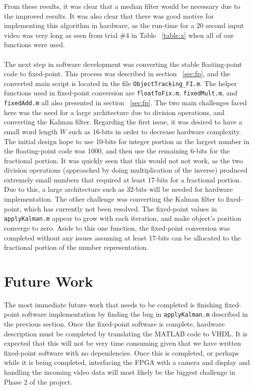 \documentclass[12pt]{article} %
\begin{document}
\FloatBarrier
\noindent
From these results, it was clear that a median filter would be necessary due to the improved results. It was also clear that there was good motive for implementing this algorithm in hardware, as the run-time for a 20 second input video was very long as seen from trial \#4 in Table ~\ref{table:x} when all of our functions were used. \\\\
The next step in software development was converting the stable floating-point code to fixed-point. This process was described in section ~\ref{sec:fp}, and the converted main script is located in the file \texttt{ObjectTracking\_FI.m}. The helper functions used in fixed-point conversion are \texttt{floatToFix.m}, \texttt{fixedMult.m}, and \texttt{fixedAdd.m} all also presented in section ~\ref{sec:fp}. The two main challenges faced here was the need for a large architecture due to division operations, and converting the Kalman filter. Regarding the first issue, it was desired to have a small word length $W$ such as 16-bits in order to decrease hardware complexity. The initial design hope to use 10-bits for integer portion as the largest number in the floating-point code was 1000, and then use the remaining 6-bits for the fractional portion. It was quickly seen that this would not not work, as the two division operations (approached by doing multiplication of the inverse) produced extremely small numbers that required at least 17-bits for a fractional portion. Due to this, a large architecture such as 32-bits will be needed for hardware implementation. The other challenge was converting the Kalman filter to fixed-point, which has currently not been resolved. The fixed-point values in \texttt{applyKalman.m} appear to grow with each iteration, and make object's position converge to zero. Aside to this one function, the fixed-point conversion was completed without any issues assuming at least 17-bits can be allocated to the fractional portion of the number representation.
\section{Future Work}
The most immediate future work that needs to be completed is finishing fixed-point software implementation by finding the bug in \texttt{applyKalman.m} described in the previous section. Once the fixed-point software is complete, hardware description must be completed by translating the MATLAB code to VHDL. It is expected that this will not be very time consuming given that we have written fixed-point software with no dependencies. Once this is completed, or perhaps while it is being completed, interfacing the FPGA with a camera and display and handling the incoming video data will most likely be the biggest challenge in Phase 2 of the project.
\end{document}
